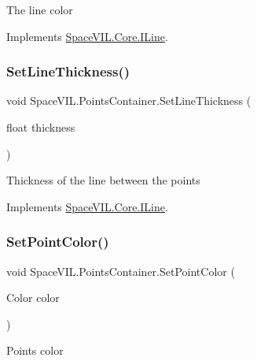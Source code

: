 The line color 



Implements \mbox{\hyperlink{interface_space_v_i_l_1_1_core_1_1_i_line}{Space\+V\+I\+L.\+Core.\+I\+Line}}.

\mbox{\label{class_space_v_i_l_1_1_points_container_a451c8c1e3a88e205d777e7a4cfe46f97}} 
\subsubsection{\texorpdfstring{Set\+Line\+Thickness()}{SetLineThickness()}}
{\footnotesize\ttfamily void Space\+V\+I\+L.\+Points\+Container.\+Set\+Line\+Thickness (\begin{DoxyParamCaption}\item[{float}]{thickness }\end{DoxyParamCaption})}



Thickness of the line between the points 



Implements \mbox{\hyperlink{interface_space_v_i_l_1_1_core_1_1_i_line}{Space\+V\+I\+L.\+Core.\+I\+Line}}.

\mbox{\label{class_space_v_i_l_1_1_points_container_a35182a540471d4cd742ad2b484cd8769}} 
\subsubsection{\texorpdfstring{Set\+Point\+Color()}{SetPointColor()}}
{\footnotesize\ttfamily void Space\+V\+I\+L.\+Points\+Container.\+Set\+Point\+Color (\begin{DoxyParamCaption}\item[{Color}]{color }\end{DoxyParamCaption})}



Points color 



